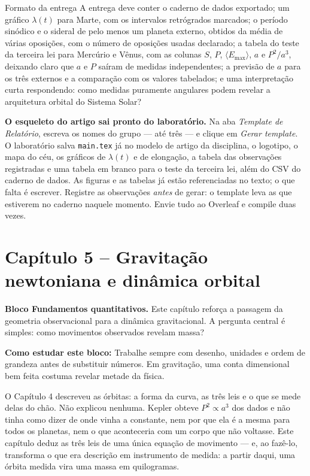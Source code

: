 \documentclass[11pt,a4paper]{article}
\newcommand{\aberturabloco}[3]{%
  \begin{noticebox}
  \textbf{Bloco #1.} #2

  \textbf{Como estudar este bloco:} #3
  \end{noticebox}
}
\begin{document}
\begin{lessonblock}{Formato da entrega}
A entrega deve conter o caderno de dados exportado; um gráfico $\lambda(t)$ para Marte, com os intervalos retrógrados marcados; o período sinódico e o sideral de pelo menos um planeta externo, obtidos da média de várias oposições, com o número de oposições usadas declarado; a tabela do teste da terceira lei para Mercúrio e Vênus, com as colunas $S$, $P$, $\langle E_{\max}\rangle$, $a$ e $P^2/a^3$, deixando claro que $a$ e $P$ saíram de medidas independentes; a previsão de $a$ para os três externos e a comparação com os valores tabelados; e uma interpretação curta respondendo: como medidas puramente angulares podem revelar a arquitetura orbital do Sistema Solar?

\textbf{O esqueleto do artigo sai pronto do laboratório.} Na aba \textit{Template de Relatório}, escreva os nomes do grupo --- até três --- e clique em \textit{Gerar template}. O laboratório salva \texttt{main.tex} já no modelo de artigo da disciplina, o logotipo, o mapa do céu, os gráficos de $\lambda(t)$ e de elongação, a tabela das observações registradas e uma tabela em branco para o teste da terceira lei, além do CSV do caderno de dados. As figuras e as tabelas já estão referenciadas no texto; o que falta é escrever. Registre as observações \emph{antes} de gerar: o template leva as que estiverem no caderno naquele momento. Envie tudo ao Overleaf e compile duas vezes.
\end{lessonblock}

\newpage

\section*{Capítulo 5 -- Gravitação newtoniana e dinâmica orbital}
\aberturabloco{Fundamentos quantitativos}{Este capítulo reforça a passagem da geometria observacional para a dinâmica gravitacional. A pergunta central é simples: como movimentos observados revelam massa?}{Trabalhe sempre com desenho, unidades e ordem de grandeza antes de substituir números. Em gravitação, uma conta dimensional bem feita costuma revelar metade da física.}

O Capítulo 4 descreveu as órbitas: a forma da curva, as três leis e o que se mede delas do chão. Não explicou
nenhuma. Kepler obteve $P^{2}\propto a^{3}$ dos dados e não tinha como dizer de onde vinha a constante, nem por
que ela é a mesma para todos os planetas, nem o que aconteceria com um corpo que não voltasse. Este capítulo
deduz as três leis de uma única equação de movimento --- e, ao fazê-lo, transforma o que era descrição em
instrumento de medida: a partir daqui, uma órbita medida vira uma massa em quilogramas.
\end{document}
